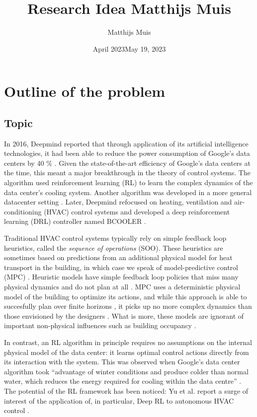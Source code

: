 \documentclass{article}
\title{Research Idea Matthijs Muis}
\author{Matthijs Muis}
\date{April 2023}
\title{\thesistitle}
\author{\thesisauthorfirst}
\date{May 19, 2023}
\theoremstyle{definition}
\theoremstyle{remark}
\begin{document}
\maketitle
\tableofcontents

\newpage

\section{Outline of the problem}
\subsection{Topic}
In 2016, Deepmind reported that through application of its artificial intelligence technologies, it had been able to reduce the power consumption of Google's data centers by 40 \% \cite{evans_gao_2016}. Given the state-of-the-art efficiency of Google's data centers at the time, this meant a major breakthrough in the theory of control systems. The algorithm used reinforcement learning (RL) to learn the complex dynamics of the data center's cooling system. Another algorithm was developed in a more general datacenter setting \cite{gamble_gao_2018}. Later, Deepmind refocused on heating, ventilation and air-conditioning (HVAC) control systems and developed a deep reinforcement learning (DRL) controller named BCOOLER \cite{luo2022controlling}. 

Traditional HVAC control systems typically rely on simple feedback loop heuristics, called the \textit{sequence of operations} (SOO). These heuristics are sometimes based on predictions from an additional physical model for heat transport in the building, in which case we speak of model-predictive control (MPC) \cite{Schwenzer_Ay_Bergs_Abel_2021}. Heuristic models have simple feedback loop policies that miss many physical dynamics and do not plan at all \cite{killian2016ten, Schwenzer_Ay_Bergs_Abel_2021}. MPC uses a deterministic physical model of the building to optimize its actions, and while this approach is able to succesfully plan over finite horizons \cite{privara2011modeling}, it picks up no more complex dynamics than those envisioned by the designers \cite{luo2022controlling}. What is more, these models are ignorant of important non-physical influences such as building occupancy \cite{killian2016ten}. 

In contrast, an RL algorithm in principle requires no assumptions on the internal physical model of the data center: it learns optimal control actions directly from its interaction with the system. This was observed when Google's data center algorithm took ``advantage of winter conditions and produce colder than normal water, which reduces the energy required for cooling within the data centre'' \cite{gamble_gao_2018}. The potential of the RL framework has been noticed: Yu et al. report a surge of interest of the application of, in particular, Deep RL to autonomous HVAC control \cite{Yuetal}.
\end{document}
